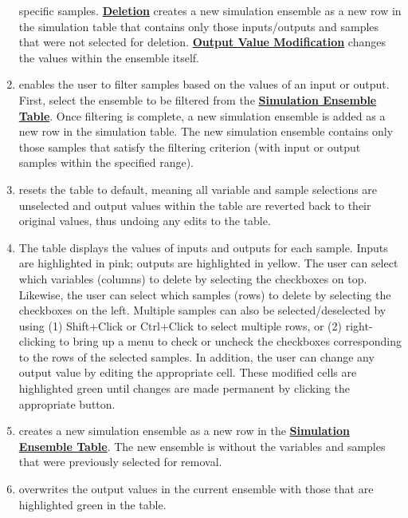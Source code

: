 \begin{enumerate}
	specific samples. \textbf{\underline{Deletion}} creates a new simulation	ensemble as a new 
	row in the simulation table that contains only those inputs/outputs and 
	samples that were not selected for deletion. \textbf{\underline{Output Value Modification}} 
	changes the values within the ensemble itself.
\item
	 enables the user to filter samples based on the values of
	an input or output. First, select the ensemble to be filtered from the \textbf{\underline{Simulation Ensemble Table}}. Once filtering is complete, a new simulation ensemble is
	added as a new row in the simulation table. The new simulation ensemble
	contains only those samples that satisfy the filtering criterion (with
	input or output samples within the specified range).

\item
	 resets the table to default, meaning all variable and
	sample selections are unselected and output values within
	the table are reverted back to their original values, thus undoing any
	edits to the table.
\item
	The table displays the values of inputs	and outputs for each sample. 
	Inputs are highlighted in pink; outputs are highlighted in yellow. The user can select which 
	variables (columns) to delete by selecting the checkboxes on top. Likewise, 
	the user can select which samples (rows) to delete by selecting the checkboxes 
	on the left. Multiple samples can also be selected/deselected by using 
	(1) Shift+Click or Ctrl+Click to select multiple rows, or (2)
	right-clicking to bring up a menu to check or uncheck the checkboxes
	corresponding to the rows of the selected samples. In addition, 
	the user can change any output value by editing the appropriate cell. These 
	modified cells are highlighted green until changes are made permanent by clicking the
	appropriate button.
\item
	 creates a new simulation
	ensemble as a new row in the \textbf{\underline{Simulation Ensemble Table}}. The new ensemble
	is without the variables and samples that were previously selected for
	removal.
\item
	 overwrites the output values in
	the current ensemble with those that are highlighted green in the table.



\end{enumerate}
